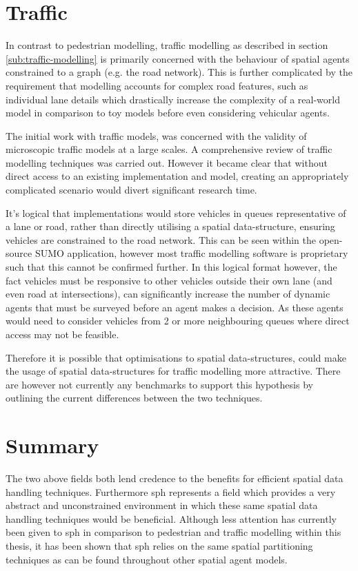   \section{Traffic}
    In contrast to pedestrian modelling, traffic modelling as described in section \ref{sub:traffic-modelling} is primarily concerned with the behaviour of spatial agents constrained to a graph (e.g. the road network). This is further complicated by the requirement that modelling accounts for complex road features, such as individual lane details which drastically increase the complexity of a real-world model in comparison to toy models before even considering vehicular agents.
    
    The initial work with traffic models, was concerned with the validity of microscopic traffic models at a large scales. A comprehensive review of traffic modelling techniques was carried out. However it became clear that without direct access to an existing implementation and model, creating an appropriately complicated scenario would divert significant research time. 
    
    It's logical that implementations would store vehicles in queues representative of a lane or road, rather than directly utilising a spatial data-structure, ensuring vehicles are constrained to the road network. This can be seen within the open-source SUMO application\cite{SUMO}, however most traffic modelling software is proprietary such that this cannot be confirmed further. In this logical format however, the fact vehicles must be responsive to other vehicles outside their own lane (and even road at intersections), can significantly increase the number of dynamic agents that must be surveyed before an agent makes a decision. As these agents would need to consider vehicles from 2 or more neighbouring queues where direct access may not be feasible.
    
    Therefore it is possible that optimisations to spatial data-structures, could make the usage of spatial data-structures for traffic modelling more attractive. There are however not currently any benchmarks to support this hypothesis by outlining the current differences between the two techniques.
    
    \section{Summary}
      The two above fields both lend credence to the benefits for efficient spatial data handling techniques. Furthermore \gls{sph} represents a field which provides a very abstract and unconstrained environment in which these same spatial data handling techniques would be beneficial. Although less attention has currently been given to \gls{sph} in comparison to pedestrian and traffic modelling within this thesis, it has been shown that \gls{sph} relies on the same spatial partitioning techniques as can be found throughout other spatial agent models.

    